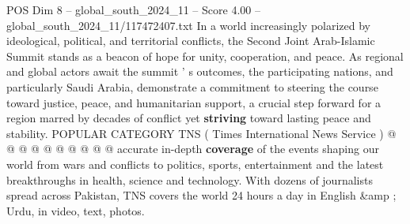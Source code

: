 \begin{textsample}{POS Dim 8 – global\_south\_2024\_11 – Score 4.00 – global\_south\_2024\_11/117472407.txt}
In a world increasingly polarized by ideological, political, and territorial conflicts, the Second Joint Arab-Islamic Summit stands as a beacon of hope for unity, cooperation, and peace.
As regional and global actors await the summit ' s outcomes, the participating nations, and particularly Saudi Arabia, demonstrate a commitment to steering the course toward justice, peace, and humanitarian support, a crucial step forward for a region marred by decades of conflict yet \textbf{striving} toward lasting peace and stability.
POPULAR CATEGORY TNS ( Times International News Service ) @ @ @ @ @ @ @ @ @ @ accurate in-depth \textbf{coverage} of the events shaping our world from wars and conflicts to politics, sports, entertainment and the latest breakthroughs in health, science and technology.
With dozens of journalists spread across Pakistan, TNS covers the world 24 hours a day in English \&amp ; Urdu, in video, text, photos.

\end{textsample}
